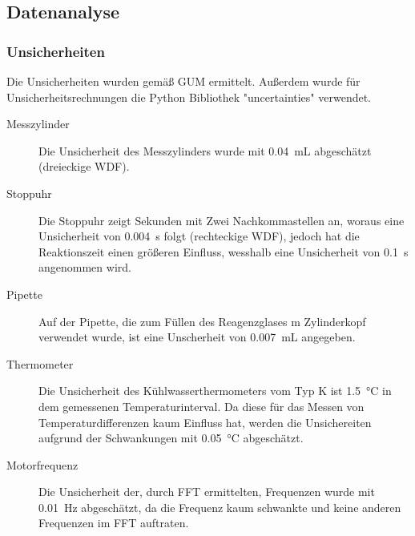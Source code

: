 \documentclass[
	a4paper,
	12pt,
	pagesize,
	ngerman
]{scrartcl}
\begin{document}
	\subsection{Datenanalyse}
	
	\subsubsection{Unsicherheiten} 
	Die Unsicherheiten wurden gemäß GUM ermittelt. 
	Außerdem wurde für Unsicherheitsrechnungen die Python Bibliothek "uncertainties" verwendet.
	\begin{description}
		\item[Messzylinder] Die Unsicherheit des Messzylinders wurde mit \SI{0,04}{mL} abgeschätzt (dreieckige WDF).
		\item[Stoppuhr] Die Stoppuhr zeigt Sekunden mit Zwei Nachkommastellen an, woraus eine Unsicherheit von \SI{0,004}{s} folgt (rechteckige WDF), jedoch hat die Reaktionszeit einen größeren Einfluss, wesshalb eine Unsicherheit von \SI{0,1}{s} angenommen wird. 
		\item[Pipette] Auf der Pipette, die zum Füllen des Reagenzglases m Zylinderkopf verwendet wurde, ist eine Unscherheit von \SI{0,007}{mL} angegeben.
		\item[Thermometer] Die Unsicherheit des Kühlwasserthermometers vom Typ K ist \SI{1,5}{\degreeCelsius} in dem gemessenen Temperaturinterval. Da diese für das Messen von Temperaturdifferenzen kaum Einfluss hat, werden die Unsichereiten aufgrund der Schwankungen mit \SI{0,05}{\degreeCelsius} abgeschätzt.
		\item[Motorfrequenz] Die Unsicherheit der, durch FFT ermittelten, Frequenzen wurde mit \SI{0,01}{Hz} abgeschätzt, da die Frequenz kaum schwankte und keine anderen Frequenzen im FFT auftraten.
	
	\end{description}
\end{document}
